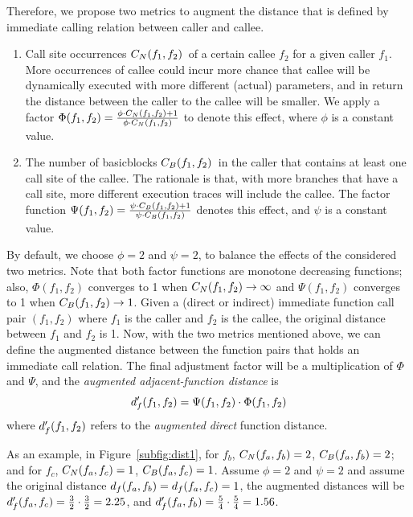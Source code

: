 Therefore, we propose two metrics to augment the distance that is defined by immediate calling relation between caller and callee.
\begin{enumerate}[(1)] 
\item Call site occurrences $C_N(f_1, f_2)$~of a certain callee $f_2$ for a given caller $f_1$. More occurrences of callee could incur more chance that callee will be dynamically executed with more different (actual) parameters, and in return the distance between the caller to the callee will be smaller. We apply a factor $\Phi(f_1,f_2)=\frac{\phi\cdot C_N(f_1, f_2)+1}{\phi\cdot C_N(f_1, f_2)}$ to denote this effect, where $\phi$ is a constant value.
\item The number of basicblocks $C_B(f_1, f_2)$~in the caller that contains at least one call site of the callee. The rationale is that, with more branches that have a call site, more different execution traces will include the callee. The factor function $\Psi(f_1,f_2)=\frac{\psi\cdot C_B(f_1, f_2)+1}{\psi\cdot C_B(f_1, f_2)}$ denotes this effect, and $\psi$ is a constant value.
\end{enumerate}

By default, we choose $\phi=2$ and $\psi=2$, to balance the effects of the considered two metrics.
Note that both factor functions are monotone decreasing functions; also, $\Phi(f_1,f_2)$ converges to 1 when $C_N(f_1, f_2)\rightarrow\infty$ and $\Psi(f_1,f_2)$ converges to 1 when $C_B(f_1, f_2)\rightarrow 1$.
Given a (direct or indirect) immediate function call pair $( f_1, f_2)$ where $f_1$ is the caller and $f_2$ is the callee, the original distance between $f_1$ and $f_2$ is 1. Now, with the two metrics mentioned above, we can define the augmented distance between the function pairs that holds an immediate call relation. The final adjustment factor will be a multiplication of $\Phi$ and $\Psi$, and the \emph{augmented adjacent-function distance} is
{\myeqsize\begin{equation}
 d^{\prime}_f(f_1,f_2) =  \Psi(f_1, f_2)\cdot\Phi(f_1, f_2)
\end{equation}}
where $d^{\prime}_f(f_1,f_2)$ refers to the \emph{augmented} \emph{direct} function distance. 

 As an example, in Figure~\ref{subfig:dist1}, for $f_b$, $C_N(f_a, f_b)=2$, $C_B(f_a, f_b)=2$; and for $f_c$, $C_N(f_a, f_c)=1$, $C_B(f_a, f_c)=1$. Assume $\phi=2$ and $\psi=2$ and assume the original distance $d_f(f_a,f_b)=d_f(f_a,f_c)=1$, the augmented distances will be $d^{\prime}_f(f_a,f_c)=\frac{3}{2}\cdot\frac{3}{2}=2.25$, and $d^{\prime}_f(f_a,f_b)=\frac{5}{4}\cdot\frac{5}{4}=1.56$.


